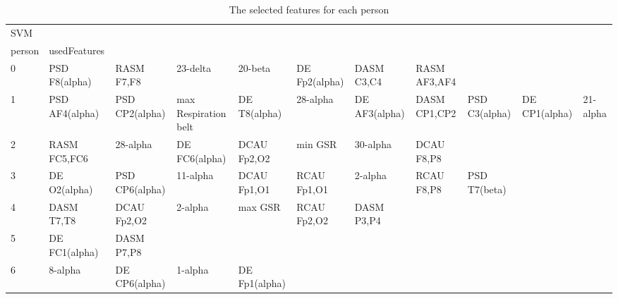 \begin{landscape}
\begin{table}[]
\centering
\caption{The selected features for each person}
\begin{tabular}{l|llllllll}
SVM      &                       &                       &                      &                         &                         &                      &                      &                       &                       &                    \\
person   & usedFeatures          &                       &                      &                         &                         &                      &                      &                       &                       &                    \\
0        & PSD F8(alpha)         & RASM F7,F8            & 23-delta             & 20-beta                 & DE Fp2(alpha)           & DASM C3,C4           & RASM AF3,AF4         &                       &                       &                    \\
1        & PSD AF4(alpha)        & PSD CP2(alpha)        & max Respiration belt & DE T8(alpha)            & 28-alpha                & DE AF3(alpha)        & DASM CP1,CP2         & PSD C3(alpha)         & DE CP1(alpha)         & 21-alpha           \\
2        & RASM FC5,FC6          & 28-alpha              & DE FC6(alpha)        & DCAU Fp2,O2             & min GSR                 & 30-alpha             & DCAU F8,P8           &                       &                       &                    \\
3        & DE O2(alpha)          & PSD CP6(alpha)        & 11-alpha             & DCAU Fp1,O1             & RCAU Fp1,O1             & 2-alpha              & RCAU F8,P8           & PSD T7(beta)          &                       &                    \\
4        & DASM T7,T8            & DCAU Fp2,O2           & 2-alpha              & max GSR                 & RCAU Fp2,O2             & DASM P3,P4           &                      &                       &                       &                    \\
5        & DE FC1(alpha)         & DASM P7,P8            &                      &                         &                         &                      &                      &                       &                       &                    \\
6        & 8-alpha               & DE CP6(alpha)         & 1-alpha              & DE Fp1(alpha)           &                         &                      &                      &                       &                       &                    \\

\end{tabular}
\end{table}
\end{landscape}

